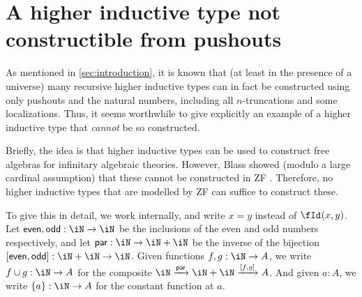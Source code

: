 \documentclass[referee]{psp}
\let\N\iN
\begin{document}
\section{A higher inductive type not constructible from pushouts}
\label{sec:blass}

As mentioned in \cref{sec:introduction}, it is known that (at least in the presence of a universe) many recursive higher inductive types can in fact be constructed using only pushouts and the natural numbers, including all $n$-truncations and some localizations.
Thus, it seems worthwhile to give explicitly an example of a higher inductive type that \emph{cannot} be so constructed.

Briefly, the idea is that higher inductive types can be used to construct free algebras for infinitary algebraic theories.
However, Blass showed (modulo a large cardinal assumption) that these cannot be constructed in ZF \cite{blass:freealg}.
Therefore, no higher inductive types that are modelled by ZF can suffice to construct these.

To give this in detail, we work internally, and write $x=y$ instead of $\id x y$.
Let $\mathsf{even},\mathsf{odd}:\N\to\N$ be the inclusions of the even and odd numbers respectively, and let $\mathsf{par}:\N\to\N+\N$ be the inverse of the bijection $[\mathsf{even},\mathsf{odd}]:\N+\N\to\N$.
Given functions $f,g:\N\to A$, we write $f\cup g:\N\to A$ for the composite $\N \xto{\mathsf{par}} \N+\N \xto{[f,g]}A$.
And given $a:A$, we write $\{a\}:\N\to A$ for the constant function at $a$.
\end{document}
